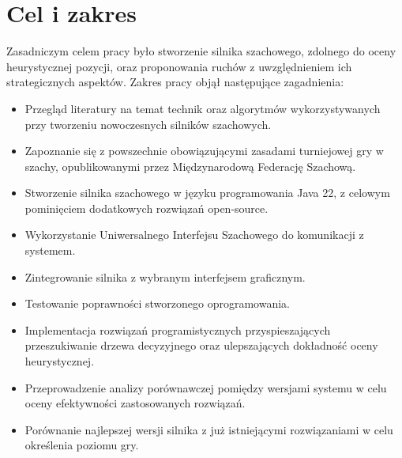 \section{Cel i zakres}
\label{sec:cel-i-zakres}

Zasadniczym celem pracy było stworzenie silnika szachowego, zdolnego do oceny heurystycznej pozycji, oraz proponowania ruchów z uwzględnieniem ich strategicznych aspektów.
Zakres pracy objął następujące zagadnienia:
\begin{itemize}
    \item Przegląd literatury na temat technik oraz algorytmów wykorzystywanych przy tworzeniu nowoczesnych silników szachowych.
    \item Zapoznanie się z powszechnie obowiązującymi zasadami turniejowej gry w szachy, opublikowanymi przez Międzynarodową Federację Szachową.
    \item Stworzenie silnika szachowego w języku programowania Java 22, z celowym pominięciem dodatkowych rozwiązań open-source.
    \item Wykorzystanie Uniwersalnego Interfejsu Szachowego do komunikacji z systemem.
    \item Zintegrowanie silnika z wybranym interfejsem graficznym.
    \item Testowanie poprawności stworzonego oprogramowania.
    \item Implementacja rozwiązań programistycznych przyspieszających przeszukiwanie drzewa decyzyjnego oraz ulepszających dokładność oceny heurystycznej.
    \item Przeprowadzenie analizy porównawczej pomiędzy wersjami systemu w celu oceny efektywności zastosowanych rozwiązań.
    \item Porównanie najlepszej wersji silnika z już istniejącymi rozwiązaniami w celu określenia poziomu gry.
\end{itemize}

